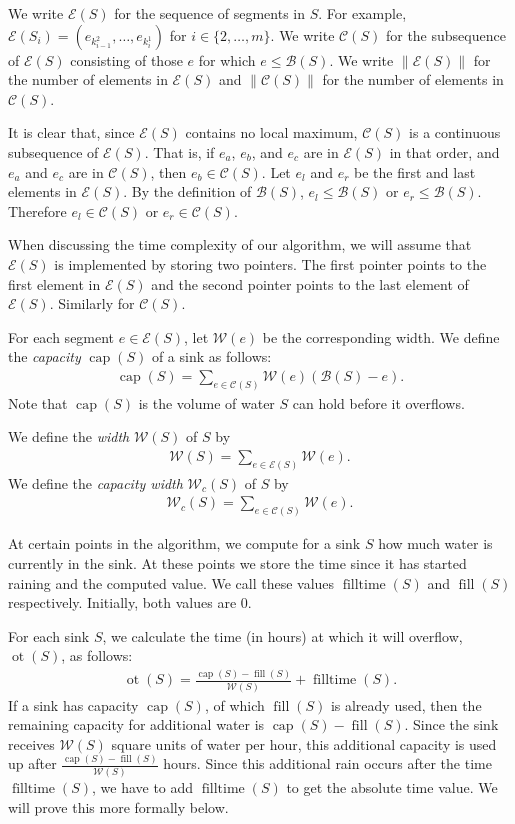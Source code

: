 \documentclass[11pt,a4paper]{article}
\newcommand{\norm}[1]{\left\lVert #1 \right\rVert}
\newcommand{\B}{\mathcal{B}}
\newcommand{\Wc}{\mathcal{W}_c}
\newcommand{\W}{\mathcal{W}}
\newcommand{\C}{\mathcal{C}}
\newcommand{\E}{\mathcal{E}}
\DeclareMathOperator{\capp}{cap}
\DeclareMathOperator{\ot}{ot}
\DeclareMathOperator{\Fill}{fill}
\DeclareMathOperator{\filltime}{filltime}
\begin{document}
We write $\E(S)$ for the sequence of segments in $S$.
For example, $\E(S_i) = (e_{k_{i-1}^2},\ldots,e_{k_i^1})$ for $i\in\{2,\ldots,m\}$.
We write $\C(S)$ for the subsequence of $\E(S)$ consisting of those $e$ for which $e \le \B(S)$.
We write $\norm{\E(S)}$ for the number of elements in $\E(S)$ and $\norm{\C(S)}$ for the number of elements in $\C(S)$.

It is clear that, since $\E(S)$ contains no local maximum, $\C(S)$ is a continuous subsequence of $\E(S)$.
That is, if $e_a$, $e_b$, and $e_c$ are in $\E(S)$ in that order, and $e_a$ and $e_c$ are in $\C(S)$, then $e_b\in\C(S)$.
Let $e_l$ and $e_r$ be the first and last elements in $\E(S)$.
By the definition of $\B(S)$, $e_l\le\B(S)$ or $e_r\le\B(S)$.
Therefore $e_l\in\C(S)$ or $e_r\in\C(S)$.

When discussing the time complexity of our algorithm, we will assume that $\E(S)$ is implemented by storing two pointers.
The first pointer points to the first element in $\E(S)$ and the second pointer points to the last element of $\E(S)$.
Similarly for $\C(S)$.

For each segment $e\in\E(S)$, let $\W(e)$ be the corresponding width.
We define the \textit{capacity} $\capp(S)$ of a sink as follows:
\begin{align*}
    \capp(S) = \sum_{e\in\C(S)} \W(e)(\B(S)-e).
\end{align*}
Note that $\capp(S)$ is the volume of water $S$ can hold before it overflows.

We define the \textit{width} $\W(S)$ of $S$ by
\begin{align*}
    \W(S) = \sum_{e\in\E(S)} \W(e).
\end{align*}
We define the \textit{capacity width} $\Wc(S)$ of $S$ by
\begin{align*}
    \Wc(S) = \sum_{e\in\C(S)} \W(e).
\end{align*}

At certain points in the algorithm, we compute for a sink $S$ how much water is currently in the sink.
At these points we store the time since it has started raining and the computed value.
We call these values $\filltime(S)$ and $\Fill(S)$ respectively.
Initially, both values are $0$.

For each sink $S$, we calculate the time (in hours) at which it will overflow, $\ot(S)$, as follows:
\begin{align*}
    \ot(S) = \frac{\capp(S) - \Fill(S)}{\W(S)} + \filltime(S).
\end{align*}
If a sink has capacity $\capp(S)$, of which $\Fill(S)$ is already used, then the remaining capacity for additional water is $\capp(S) - \Fill(S)$.
Since the sink receives $\W(S)$ square units of water per hour, this additional capacity is used up after $\frac{\capp(S) - \Fill(S)}{\W(S)}$ hours.
Since this additional rain occurs after the time $\filltime(S)$, we have to add $\filltime(S)$ to get the absolute time value.
We will prove this more formally below.
\end{document}
